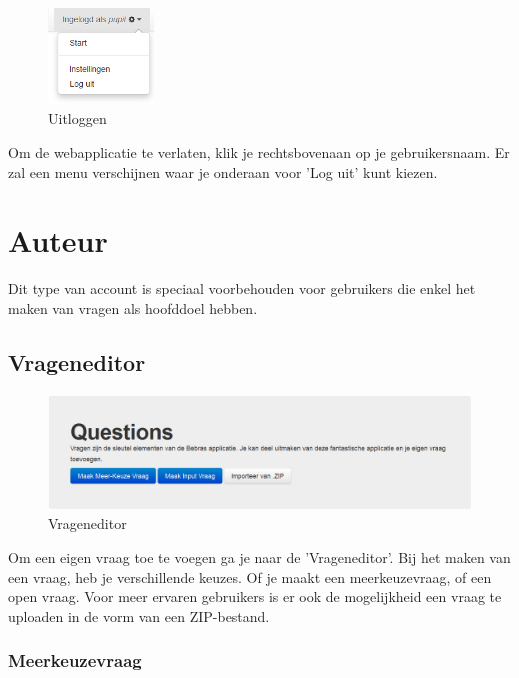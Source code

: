 \documentclass[]{article}
\begin{document}
\begin{figure}[!ht]
	\centering
	\includegraphics[width=0.25\textwidth]{img/logout}
	\caption{Uitloggen}
	\label{logout}
\end{figure} 

Om de webapplicatie te verlaten, klik je rechtsbovenaan op je gebruikersnaam. Er zal een menu verschijnen waar je onderaan voor 'Log uit' kunt kiezen.

\section{Auteur}

Dit type van account is speciaal voorbehouden voor gebruikers die enkel het maken van vragen als hoofddoel hebben.

\subsection{Vrageneditor}

\begin{figure}[!ht]
	\centering
	\includegraphics[width=1\textwidth]{img/questioneditor}
	\caption{Vrageneditor}
	\label{questioneditor}
\end{figure}

Om een eigen vraag toe te voegen ga je naar de 'Vrageneditor'. Bij het maken van een vraag, heb je verschillende keuzes. Of je maakt een meerkeuzevraag, of een open vraag. Voor meer ervaren gebruikers is er ook de mogelijkheid een vraag te uploaden in de vorm van een ZIP-bestand.

\subsubsection{Meerkeuzevraag}
\end{document}
